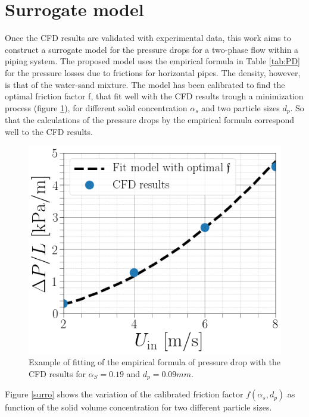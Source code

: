 \documentclass[11pt]{report}
\begin{document}
\section{Surrogate model}
%
 Once the CFD results are validated with experimental data, this work aims to construct a surrogate model for the pressure drops for a two-phase flow within a piping system. 
 The proposed model uses the empirical formula in Table \ref{tab:PD} for the pressure losses due to frictions for horizontal pipes. 
 The density, however, is that of the water-sand mixture. 
 The model has been calibrated to find the optimal friction factor f, that fit well with the CFD results trough a minimization process (figure \ref{optimal}), for different solid concentration $\alpha_s$ and two particle sizes $d_p$. 
 So that the calculations of the pressure drops by the empirical formula correspond well to the CFD results. 
%
 \begin{figure}[ht!]
 \begin{center}
 \includegraphics[scale = 0.35]{figs/alpha3D0.png}
 \caption{Example of fitting of the empirical formula of pressure drop with the CFD results for $\alpha_S = 0.19$ and $d_p = 0.09 mm$.}
 \label{optimal}
 \end{center}
 \end{figure}
%
 Figure \ref{surro} shows the variation of the calibrated friction factor $f(\alpha_s,d_p)$ as function of the solid volume concentration for two different particle sizes.
\end{document}
